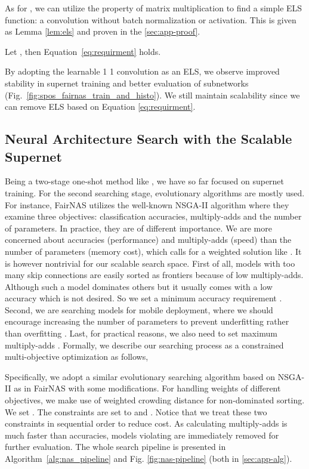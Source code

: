 \documentclass[runningheads]{llncs}
\begin{document}
As for , we can utilize the property of matrix multiplication to find a simple ELS function:  a  convolution without batch normalization or activation. This is given as Lemma \ref{lem:els} and proven in the \ref{sec:app-proof}.

\begin{lemma}\label{lem:els}
	Let , then Equation~\ref{eq:requirment} holds. 
	
\end{lemma}

By adopting the learnable 1  1 convolution as an ELS, we observe improved stability in supernet training and better evaluation of subnetworks (Fig.~\ref{fig:spos_fairnas_train_and_histo}). We still maintain scalability since we can remove ELS based on Equation \ref{eq:requirment}. 


\subsection{Neural Architecture Search with the Scalable Supernet}
Being a two-stage one-shot method like \cite{bender2018understanding,guo2019single,chu2019fairnas}, we have so far focused on supernet training. For the second searching stage, evolutionary algorithms are mostly used. For instance, FairNAS \cite{chu2019fairnas} utilizes the well-known NSGA-II algorithm \cite{deb2002fast} where they examine three objectives: classification accuracies, multiply-adds and the number of parameters. In practice, they are of different importance. We are more concerned  about accuracies (performance) and multiply-adds (speed) than the number of parameters (memory cost), which calls for a weighted solution like \cite{chu2019moga}.  It is however nontrivial for our scalable search space. First of all, models with too many skip connections are easily sorted as frontiers because of low multiply-adds. Although such a model dominates others but it usually comes with a low accuracy which is not desired. So we set a minimum accuracy requirement . Second, we are searching models for mobile deployment, where we should encourage increasing the number of parameters to prevent underfitting rather than overfitting \cite{zhang2018shufflenet}. Last, for practical reasons, we also need to set maximum multiply-adds . Formally, we describe our searching process as a constrained multi-objective optimization as follows,



Specifically, we adopt a similar evolutionary searching algorithm based on NSGA-II \cite{deb2002fast} as in FairNAS \cite{chu2019fairnas} with some modifications. For handling weights of different objectives, we make use of weighted crowding distance \cite{friedrich2011weighted} for non-dominated sorting. We set . The constraints are set to  and . Notice that we treat these two constraints in sequential order to reduce cost. As calculating multiply-adds is much faster than accuracies, models violating  are immediately removed for further evaluation. The whole search pipeline is presented in Algorithm~\ref{alg:nas_pipeline} and Fig. \ref{fig:nas-pipeline} (both in \ref{sec:app-alg}). 
\end{document}
